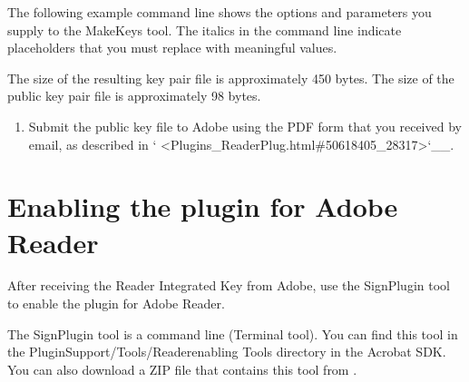 \documentclass[letterpaper,12pt,english,openany,oneside]{sphinxmanual}
\begin{document}
The following example command line shows the options and parameters you supply to the MakeKeys tool. The italics in the command line indicate placeholders that you must replace with meaningful values.

\begin{sphinxVerbatim}[commandchars=\\\{\}]
     
\end{sphinxVerbatim}

The size of the resulting key pair file is approximately 450 bytes. The size of the public key pair file is approximately 98 bytes.
\begin{enumerate}
%
\setcounter{enumi}{3}
\item {} 
Submit the public key file to Adobe using the PDF form that you received by email, as described in ` <Plugins\_ReaderPlug.html\#50618405\_28317>`\_\_.

\end{enumerate}


\section{Enabling the plugin for Adobe Reader}
\label{\detokenize{Plugins_ReaderPlug:enabling-the-plugin-for-adobe-reader}}
After receiving the Reader Integrated Key from Adobe, use the SignPlugin tool to enable the plugin for Adobe Reader.

The SignPlugin tool is a command line (Terminal tool). You can find this tool in the PluginSupport/Tools/Reader\sphinxhyphen{}enabling Tools directory in the Acrobat SDK. You can also download a ZIP file that contains this tool from .
\end{document}
